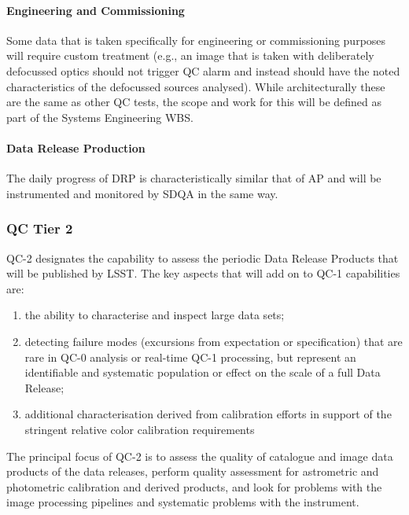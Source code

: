 \paragraph{Engineering and Commissioning}

Some data that is taken specifically for engineering or commissioning purposes will require custom treatment (e.g., an image that is taken with deliberately defocussed optics should not trigger QC alarm and instead should have the noted characteristics of the defocussed sources analysed). While architecturally these are the same as other QC tests, the scope and work for this will be defined as part of the Systems Engineering WBS.

\paragraph{Data Release Production}

The daily progress of DRP is characteristically similar that of AP and will be instrumented and monitored by SDQA in the same way.

\subsubsection{QC Tier 2}

QC-2 designates the capability to assess the periodic Data Release Products that will be published by LSST.  The key aspects that will add on to QC-1 capabilities are:

\begin{enumerate}

\item the ability to characterise and inspect large data sets;

\item detecting failure modes (excursions from expectation or specification) that are rare in QC-0 analysis or real-time QC-1 processing, but represent an identifiable and systematic population or effect on the scale of a full Data Release;

\item additional characterisation derived from calibration efforts in support of the stringent relative color calibration requirements

\end{enumerate}

The principal focus of QC-2 is to assess the quality of catalogue and image data products of the data releases, perform quality assessment for astrometric and photometric calibration and derived products, and look for problems with the image processing pipelines and systematic problems with the instrument.

